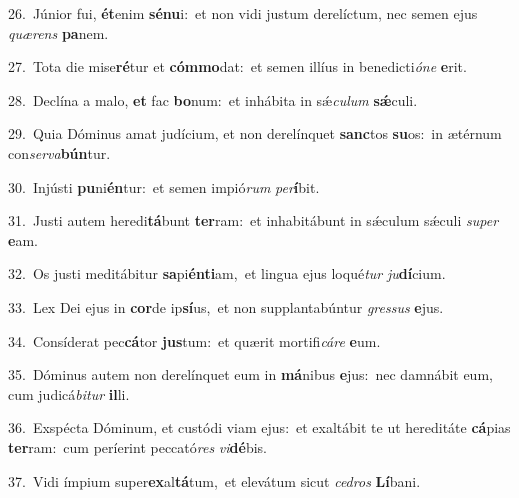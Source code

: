 {\numbfont\textcolor{\numbcolor}{26.}}~Júnior fui, \textbf{ét}\-enim \textbf{sé}\-\textbf{nu}i:~\star et non vidi justum derelíctum, nec semen ejus \textit{quæ}\-\textit{rens} \textbf{pa}\-nem.\par
{\numbfont\textcolor{\numbcolor}{27.}}~Tota die mise\-\textbf{ré}\-tur et \textbf{cóm}\-\textbf{mo}dat:~\star et semen illíus in benedicti\-\textit{ó}\-\textit{ne} \textbf{e}\-rit.\par
{\numbfont\textcolor{\numbcolor}{28.}}~Declína a malo, \textbf{et} fac \textbf{bo}\-num:~\star et inhábita in sǽ\-\textit{cu}\-\textit{lum} \textbf{sǽ}\-culi.\par
{\numbfont\textcolor{\numbcolor}{29.}}~Quia Dóminus amat judícium, et non derelínquet \textbf{sanc}\-tos \textbf{su}\-os:~\star in ætérnum con\-\textit{ser}\-\textit{va}\textbf{bún}tur.\par
{\numbfont\textcolor{\numbcolor}{30.}}~Injústi \textbf{pu}\-ni\-\textbf{én}\-tur:~\star et semen impió\textit{rum} \textit{per}\-\textbf{í}bit.\par
{\numbfont\textcolor{\numbcolor}{31.}}~Justi autem heredi\-\textbf{tá}\-bunt \textbf{ter}\-ram:~\star et inhabitábunt in sǽculum sǽculi \textit{su}\-\textit{per} \textbf{e}\-am.\par
{\numbfont\textcolor{\numbcolor}{32.}}~Os justi meditábitur \textbf{sa}\-pi\-\textbf{én}\-\textbf{ti}am,~\star et lingua ejus loqué\textit{tur} \textit{ju}\-\textbf{dí}cium.\par
{\numbfont\textcolor{\numbcolor}{33.}}~Lex Dei ejus in \textbf{cor}\-de ip\-\textbf{sí}\-us,~\star et non supplantabúntur \textit{gres}\-\textit{sus} \textbf{e}\-jus.\par
{\numbfont\textcolor{\numbcolor}{34.}}~Consíderat pec\-\textbf{cá}\-tor \textbf{jus}\-tum:~\star et quærit mortifi\-\textit{cá}\-\textit{re} \textbf{e}\-um.\par
{\numbfont\textcolor{\numbcolor}{35.}}~Dóminus autem non derelínquet eum in \textbf{má}\-nibus \textbf{e}\-jus:~\star nec damnábit eum, cum judicá\-\textit{bi}\-\textit{tur} \textbf{il}\-li.\par
{\numbfont\textcolor{\numbcolor}{36.}}~Exspécta Dóminum, et custódi viam ejus:~\dagger et exaltábit te ut hereditáte \textbf{cá}\-pias \textbf{ter}\-ram:~\star cum períerint peccató\textit{res} \textit{vi}\-\textbf{dé}bis.\par
{\numbfont\textcolor{\numbcolor}{37.}}~Vidi ímpium super\-\textbf{ex}\-al\-\textbf{tá}\-tum,~\star et elevátum sicut \textit{ce}\-\textit{dros} \textbf{Lí}\-bani.\par

